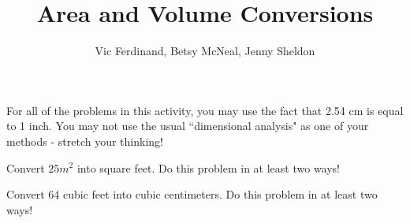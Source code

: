 \documentclass{ximera}
\title{Area and Volume Conversions}
\author{Vic Ferdinand, Betsy McNeal, Jenny Sheldon}
\begin{document}
\begin{abstract}\end{abstract}
\maketitle


For all of the problems in this activity, you may use the fact that 2.54 cm is equal to 1 inch.  You may not use the usual ``dimensional analysis" as one of your methods - stretch your thinking!



\begin{problem}
Convert $25m^2$ into square feet.  Do this problem in at least two ways!

\end{problem}

\begin{problem}
Convert $64$ cubic feet into cubic centimeters.  Do this problem in at least two ways!

\end{problem}
\end{document}
